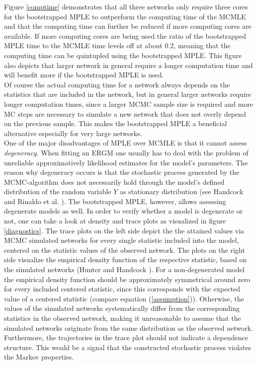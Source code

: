 \documentclass[10pt, conference, compsocconf]{IEEEtran}
\begin{document}
Figure \ref{comptime} demonstrates that all three networks only require three cores for the bootstrapped MPLE to outperform the computing time of the MCMLE and that the computing time can further be reduced if more computing cores are available. If more computing cores are being used the ratio of the bootstrapped MPLE time to the MCMLE time levels off at about $0.2$, meaning that the computing time can be quintupled using the bootstrapped MPLE. This figure also depicts that larger network in general require a longer computation time and will benefit more if the bootstrapped MPLE is used.\\ 
Of course the actual computing time for a network always depends on the statistics that are included in the network, but in general larger networks require longer computation times, since a larger MCMC sample size is required and more MC steps are necessary to simulate a new network that does not overly depend on the previous sample. This makes the bootstrapped MPLE a beneficial alternative especially for very large networks. \\[0.3cm]
One of the major disadvantages of MPLE over MCMLE is that it cannot assess {\it degeneracy}. When fitting an ERGM one usually has to deal with the problem of unreliable approximatively likelihood estimates for the model's parameters. The reason why degeneracy occurs is that the stochastic process generated by the MCMC-algorithm does not necessarily hold through the model's defined distribution of the random variable $Y$ as stationary distribution (see Handcock \cite{Handcock.2003} and Rinaldo et al. \cite{Rinaldo2009}). The bootstrapped MPLE, however, allows assessing degenerate models as well. In order to verify whether a model is degenerate or not, one can take a look at density and trace plots as visualized in figure \ref{diagnostics}. The trace plots on the left side depict the the attained values via MCMC simulated networks for every single statistic included into the model, centered on the statistic values of the observed network. The plots on the right side visualize the empirical density function of the respective statistic, based on the simulated networks (Hunter and Handcock \cite{Hunter.2006}). For a non-degenerated model the empirical density function should be approximately symmetrical around zero for every included centered statistic, since this corresponds with the expected value of a centered statistic (compare equation (\ref{assumption})). 
Otherwise, the values of the simulated networks systematically differ from the corresponding statistics in the observed network, making it unreasonable to assume that the simulated networks originate from the same distribution as the observed network. Furthermore, the trajectories in the trace plot should not indicate a dependence structure. This would be a signal that the constructed stochastic process violates the Markov properties.
\end{document}
